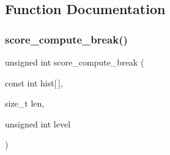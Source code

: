 \subsection{Function Documentation}
\mbox{\label{score_8c_a2879d92d899fcd81e056a304c03b3698}} 
\subsubsection{score\+\_\+compute\+\_\+break()}
{\footnotesize\ttfamily unsigned int score\+\_\+compute\+\_\+break (\begin{DoxyParamCaption}\item[{const int}]{hist[$\,$],  }\item[{size\+\_\+t}]{len,  }\item[{unsigned int}]{level }\end{DoxyParamCaption})}

